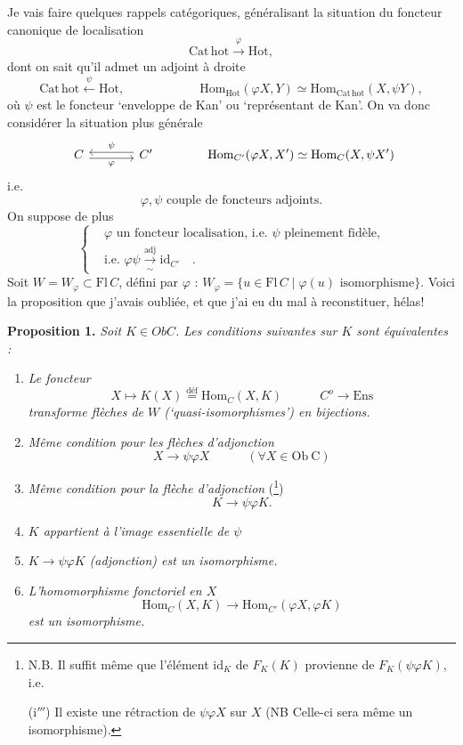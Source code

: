 \documentclass[11pt]{article}
\newcommand{\printedpage}[1]{\marginpar{\footnotesize p.~#1}}
\newcommand{\msp}[1]{\marginpar{\footnotesize [#1]}}
\newcommand{\dfeq}{\overset{\text{déf}}{=}}
\newcommand{\Cathot}{\mathrm{Cat\,hot}}
\begin{document}
\msp{page 37}
Je vais faire quelques rappels catégoriques, généralisant la situation du foncteur canonique de localisation
\[
\Cathot\xrightarrow{\ \varphi\ }\mathrm{Hot},
\]
dont on sait qu'il admet un adjoint à droite
\[
\Cathot\xleftarrow{\ \psi\ }\mathrm{Hot}, \qquad\qquad\qquad \mathrm{Hom}_{\mathrm{Hot}}(\varphi X,Y)\simeq\mathrm{Hom}_{\Cathot}(X,\psi Y),
\]
où $\psi$ est le foncteur ‘enveloppe de Kan’ ou ‘représentant de Kan’. On va donc considérer la situation plus générale
\[
\begin{tikzcd}[column sep=large]
C \arrow[r, shift right=1, "\varphi"'] & C' \arrow[l, shift right=1, "\psi"']
\end{tikzcd}
\qquad\qquad \mathrm{Hom}_{C'}(\varphi X,X')\simeq\mathrm{Hom}_{C}(X,\psi X')
\]
i.e.
\[
\varphi,\psi \text{ couple de foncteurs adjoints.}
\]
On suppose de plus
\[
\left\{
\begin{aligned}
&\varphi \text{ un foncteur localisation, i.e. } \psi \text{ pleinement fidèle,}\\
&\text{i.e. } \varphi\psi\xrightarrow[\sim]{\text{adj}}\mathrm{id}_{C'} \quad .
\end{aligned}
\right.
\]
Soit $W=W_{\varphi}\subset\mathrm{Fl}\,C$, défini par $\varphi$ : $W_{\varphi}=\{u\in\mathrm{Fl}\,C\mid\varphi(u)\text{ isomorphisme}\}$. Voici la proposition que j'avais oubliée, et que j'ai eu du mal à reconstituer, hélas!

\textbf{Proposition 1.} \textit{Soit $K\in \mathit{Ob}C$. Les conditions suivantes sur $K$ sont équivalentes :}

\printedpage{23}

\begin{enumerate}
\item[(i)] \textit{Le foncteur}
\[
X\longmapsto K(X)\dfeq\mathrm{Hom}_C(X,K) \qquad\quad C^{o}\longrightarrow\mathrm{Ens}
\]
\textit{transforme flèches de $W$ (‘quasi-isomorphismes’) en bijections.}
\item[(i$'$)] \textit{Même condition pour les flèches d'adjonction}
\[
X\longrightarrow\psi\varphi X \qquad\quad (\forall X\in\mathrm{Ob}\ \mathrm{C})
\]
\item[(i$''$)] \textit{Même condition pour la flèche d'adjonction} (\footnote[6]{N.B. Il suffit même que l'élément $\mathrm{id}_K$ de $F_K(K)$ provienne de $F_K(\psi\varphi K)$, i.e.\par (i$'''$) Il existe une rétraction de $\psi\varphi X$ sur $X$ (NB Celle-ci sera même un isomorphisme).})
\[
K\longrightarrow\psi\varphi K.
\]
\item[(ii)] \textit{$K$ appartient à l'image essentielle de $\psi$}
\item[(ii$'$)] \textit{$K\longrightarrow\psi\varphi K$ (adjonction) est un isomorphisme.}
\item[(ii$''$)] \textit{L'homomorphisme fonctoriel en $X$}
\[
\mathrm{Hom}_C(X,K)\longrightarrow\mathrm{Hom}_{C'}(\varphi X,\varphi K)
\]
\textit{est un isomorphisme.}
\end{enumerate}
\end{document}
